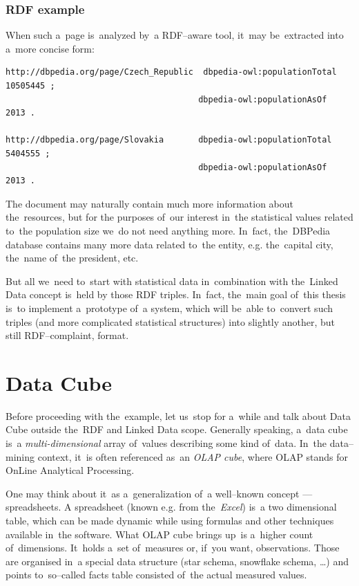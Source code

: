 \subsubsection{RDF example}

When such a~page is~analyzed by~a RDF--aware tool, it~may be~extracted into a~more concise form:

\scriptsize\begin{verbatim}
http://dbpedia.org/page/Czech_Republic	dbpedia-owl:populationTotal		10505445 ;
                                       dbpedia-owl:populationAsOf		2013 .

http://dbpedia.org/page/Slovakia       dbpedia-owl:populationTotal		5404555 ;
                                       dbpedia-owl:populationAsOf		2013 .
\end{verbatim}\normalsize

The document may naturally contain much more information about the~resources, but for the
purposes of~our interest in~the statistical values related to~the population size we~do not
need anything more. In~fact, the~DBPedia database contains many more data related to~the entity,
e.g. the~capital city, the~name of~the president, etc.

But all we~need to~start with statistical data in~combination with the~Linked Data concept is~held
by those RDF triples. In~fact, the~main goal of~this thesis is~to implement a~prototype of~a 
system, which will be~able to~convert such triples (and more complicated statistical structures) into
slightly another, but still RDF--complaint, format.

\section{Data Cube}
\label{sec:datacube}
Before proceeding with the~example, let us~stop for a~while and talk about Data Cube outside
the~RDF and Linked Data scope. Generally speaking, a~data cube is~a \emph{multi-dimensional}
 array of~values describing some kind of~data. In~the
data--mining context, it~is often referenced as~an \emph{OLAP cube}, where OLAP stands for OnLine
Analytical Processing.

One may think about it~as a~generalization of~a well--known concept --- spreadsheets.
A spreadsheet (known e.g. from the~\emph{Excel}) is~a two dimensional table, which can be
made dynamic while using formulas and other techniques available in~the software. What
OLAP cube brings up~is a~higher count of~dimensions. It~holds a~set of~measures or, if~you
want, observations. Those are organised in~a special data structure (star schema, snowflake
schema, …) and points to~so--called facts table consisted of~the actual measured values.

